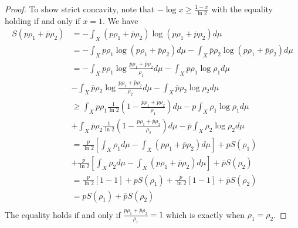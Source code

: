 \begin{mathSection}
\begin{proof}
		To show strict concavity, note that $- \log x \geq \frac{1-x}{\ln 2}$ with the equality holding if and only if $x=1$. We have
		\begin{equation}
			\begin{aligned}
				S(p\rho_1 + \bar{p}\rho_2) &= - \int_X \left(p\rho_1 + \bar{p}\rho_2\right) \log \left(p\rho_1 + \bar{p}\rho_2\right) d\mu \\
				&= - \int_X p\rho_1 \log \left(p\rho_1 + \bar{p}\rho_2\right) d\mu - \int_X \bar{p}\rho_2 \log \left(p\rho_1 + \bar{p}\rho_2\right) d\mu \\
				&= - \int_X p\rho_1 \log \frac{p\rho_1 + \bar{p}\rho_2}{\rho_1} d\mu - \int_X p\rho_1 \log \rho_1 d\mu \\
				&- \int_X \bar{p}\rho_2 \log \frac{p\rho_1 + \bar{p}\rho_2}{\rho_2} d\mu - \int_X \bar{p}\rho_2 \log \rho_2 d\mu \\
				&\geq \int_X p\rho_1 \frac{1}{\ln 2} \left(1 - \frac{p\rho_1 + \bar{p}\rho_2}{\rho_1} \right)   d\mu - p \int_X \rho_1 \log \rho_1 d\mu \\
				&+ \int_X \bar{p}\rho_2 \frac{1}{\ln 2} \left(1 - \frac{p\rho_1 + \bar{p}\rho_2}{\rho_2} \right)   d\mu - \bar{p} \int_X \rho_2 \log \rho_2 d\mu \\
				&= \frac{p}{\ln 2}\left[ \int_X \rho_1 d\mu - \int_X \left(p\rho_1 + \bar{p}\rho_2\right) d\mu  \right] + p S(\rho_1) \\
				&+ \frac{\bar{p}}{\ln 2}\left[ \int_X \rho_2 d\mu - \int_X \left(p\rho_1 + \bar{p}\rho_2\right) d\mu  \right] + \bar{p} S(\rho_2) \\
				&= \frac{p}{\ln 2}\left[ 1 - 1  \right] + p S(\rho_1) + \frac{\bar{p}}{\ln 2}\left[ 1 - 1 \right] + \bar{p} S(\rho_2) \\
				&= p S(\rho_1) + \bar{p} S(\rho_2) \\
			\end{aligned}
		\end{equation}
		The equality holds if and only if $\frac{p\rho_1 + \bar{p}\rho_2}{\rho_1} = 1$ which is exactly when $\rho_1 = \rho_2$.
		

\end{proof}
\end{mathSection}
